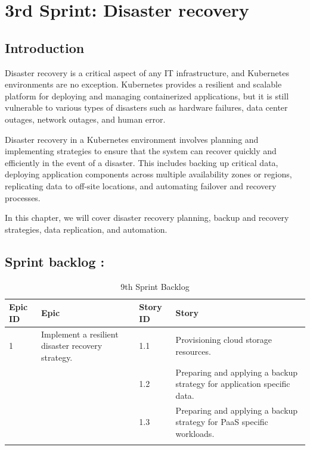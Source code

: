 \graphicspath{{./assets/}}
\setcounter{mtc}{4}
\chapter{3rd Sprint: Disaster recovery }

\minitoc
\newpage
\section*{Introduction}
Disaster recovery is a critical aspect of any IT infrastructure, and Kubernetes environments are no exception. Kubernetes provides a resilient and scalable platform for deploying and managing containerized applications, but it is still vulnerable to various types of disasters such as hardware failures, data center outages, network outages, and human error. 

Disaster recovery in a Kubernetes environment involves planning and implementing strategies to ensure that the system can recover quickly and efficiently in the event of a disaster. This includes backing up critical data, deploying application components across multiple availability zones or regions, replicating data to off-site locations, and automating failover and recovery processes. 

In this chapter, we will cover disaster recovery planning, backup and recovery strategies, data replication, and automation.  


\section{Sprint backlog :}

\begin{longtable}[H]{|m{1.5cm}|m{3cm}|m{1.5cm}|m{9cm}|}
\hline
{\textbf{Epic ID}} & {\textbf{Epic}} & {\textbf{Story ID}} & {\textbf{Story}}\\
\hline
1  & Implement a resilient disaster recovery strategy.  &  1.1	 & Provisioning cloud storage resources. \\
\cline{3-4}
& & 1.2 & Preparing and applying a backup strategy for application specific data.  \\
\cline{3-4}
& & 1.3	& Preparing and applying a backup strategy for PaaS specific workloads.   \\
\cline{3-4}
\hline
\caption{9th Sprint Backlog}
\end{longtable}

